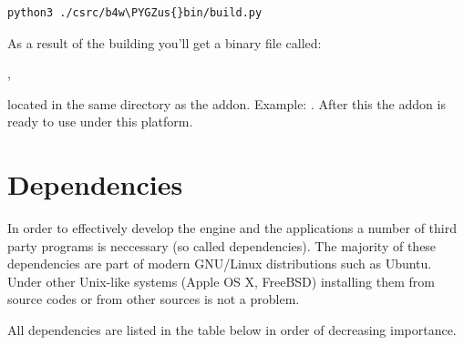 \documentclass[a4paper,12pt,oneside]{sphinxmanual}
\def\PYGZus{\char`\_}
\begin{document}
\begin{Verbatim}[commandchars=\\\{\}]
python3 ./csrc/b4w\PYGZus{}bin/build.py
\end{Verbatim}

As a result of the building you'll get a binary file called:

,

located in the same directory as the addon. Example: . After this the addon is ready to use under this platform.


\section{Dependencies}
\label{developers_advanced:dependencies}\label{developers_advanced:id5}
In order to effectively develop the engine and the applications a number of third party programs is neccessary (so called dependencies). The majority of these dependencies are part of modern GNU/Linux distributions such as Ubuntu. Under other Unix-like systems (Apple OS X, FreeBSD) installing them from source codes or from other sources is not a problem.

All dependencies are listed in the table below in order of decreasing importance.
\end{document}
